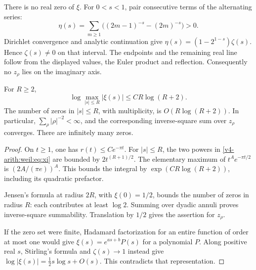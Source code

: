 There is no real zero of \(\xi\). For \(0<s<1\), pair consecutive
terms of the alternating series:
\[
 \eta(s)=\sum_{m\ge1}
       \bigl((2m-1)^{-s}-(2m)^{-s}\bigr)>0.
\]
Dirichlet convergence and analytic continuation give
\(\eta(s)=(1-2^{1-s})\zeta(s)\). Hence \(\zeta(s)\ne0\) on that
interval. The endpoints and the remaining real line follow from
the displayed values, the Euler product and reflection.
Consequently no \(z_\rho\) lies on the imaginary axis.

\begin{lemma}
\label{v4-arith:weil:lem:zeros}
For \(R\ge2\),
\[
 \log\max_{|s|\le R}|\xi(s)|\le CR\log(R+2).
\]
The number of zeros in \(|s|\le R\), with multiplicity, is
\(O(R\log(R+2))\). In particular,
\(\sum_\rho|\rho|^{-2}<\infty\), and the corresponding inverse-square
sum over \(z_\rho\) converges. There are infinitely many zeros.
\end{lemma}
\begin{proof}
On \(t\ge1\), one has \(r(t)\le C e^{-\pi t}\).
For \(|s|\le R\), the two powers in \eqref{v4-arith:weil:eq:xi}
are bounded by \(2t^{(R+1)/2}\).
The elementary maximum of \(t^A e^{-\pi t/2}\) is
\((2A/(\pi e))^A\). This bounds the integral by
\(\exp(CR\log(R+2))\), including its quadratic prefactor.

Jensen's formula at radius \(2R\), with \(\xi(0)=1/2\), bounds the
number of zeros in radius \(R\): each contributes at least \(\log2\).
Summing over dyadic annuli proves inverse-square summability.
Translation by \(1/2\) gives the assertion for \(z_\rho\).

If the zero set were finite, Hadamard factorization for an entire
function of order at most one would give \(\xi(s)=e^{as+b}P(s)\)
for a polynomial \(P\). Along positive real \(s\), Stirling's formula
and \(\zeta(s)\to1\) instead give
\(\log|\xi(s)|=\tfrac12s\log s+O(s)\).
This contradicts that representation.
\end{proof}

